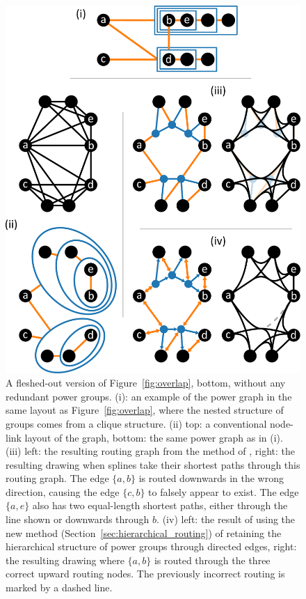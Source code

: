 \begin{figure}
  \centering
  \includegraphics[width=.8\linewidth]{power/shortcircuit_big.pdf}
  \caption[A full version of Figure~\ref{fig:overlap}]{A fleshed-out version of Figure~\ref{fig:overlap}, bottom, without any redundant power groups.
  (i): an example of the power graph in the same layout as Figure~\ref{fig:overlap}, where the nested structure of groups comes from a clique structure.
  (ii) top: a conventional node-link layout of the graph, bottom: the same power graph as in (i). 
  (iii) left: the resulting routing graph from the method of \citet{Bach2017}, right: the resulting drawing when splines take their shortest paths through this routing graph. The edge $\{a,b\}$ is routed downwards in the wrong direction, causing the edge $\{c,b\}$ to falsely appear to exist.
  The edge $\{a,e\}$ also has two equal-length shortest paths, either through the line shown or downwards through $b$.
  (iv) left: the result of using the new method (Section~\ref{sec:hierarchical_routing}) of retaining the hierarchical structure of power groups through directed edges, right: the resulting drawing where $\{a,b\}$ is routed through the three correct upward routing nodes. The previously incorrect routing is marked by a dashed line.
  }
  \label{fig:overlap_sm}
\end{figure}
